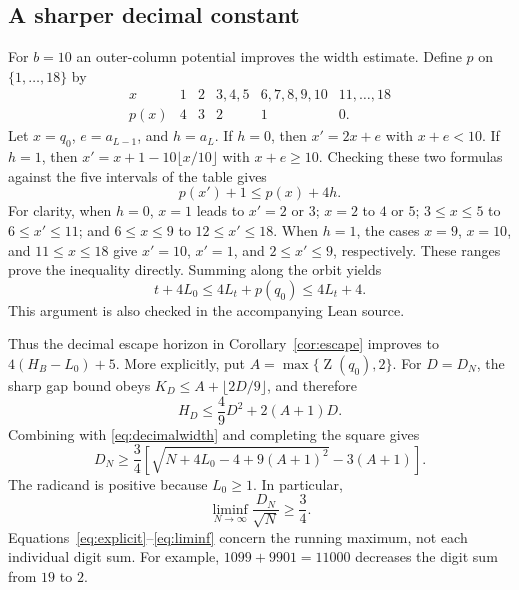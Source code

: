 \documentclass[11pt]{article}
\newcommand{\zg}{\operatorname{Z}}
\begin{document}
\subsection*{A sharper decimal constant}
For $b=10$ an outer-column potential improves the width estimate.
Define $p$ on $\{1,\ldots,18\}$ by
\[
\begin{array}{c|ccccc}
x&1&2&3,4,5&6,7,8,9,10&11,\ldots,18\\ \hline
p(x)&4&3&2&1&0.
\end{array}
\]
Let $x=q_0$, $e=a_{L-1}$, and $h=a_L$. If $h=0$, then
$x'=2x+e$ with $x+e<10$. If $h=1$, then
$x'=x+1-10\lfloor x/10\rfloor$ with $x+e\geq10$.
Checking these two formulas against the five intervals of the table gives
\[
 p(x')+1\leq p(x)+4h.
\]
For clarity, when $h=0$, $x=1$ leads to $x'=2$ or $3$;
$x=2$ to $4$ or $5$; $3\leq x\leq5$ to $6\leq x'\leq11$;
and $6\leq x\leq9$ to $12\leq x'\leq18$.
When $h=1$, the cases $x=9$, $x=10$, and $11\leq x\leq18$
give $x'=10$, $x'=1$, and $2\leq x'\leq9$, respectively.
These ranges prove the inequality directly. Summing along the orbit yields
\begin{equation}\label{eq:decimalwidth}
 t+4L_0\leq4L_t+p(q_0)\leq4L_t+4.
\end{equation}
This argument is also checked in the accompanying Lean source.

Thus the decimal escape horizon in Corollary~\ref{cor:escape} improves to
$4(H_B-L_0)+5$. More explicitly, put $A=\max\{\zg(q_0),2\}$.
For $D=D_N$, the sharp gap bound obeys
$K_D\leq A+\lfloor2D/9\rfloor$, and therefore
\[
 H_D\leq\frac49D^2+2(A+1)D.
\]
Combining with \eqref{eq:decimalwidth} and completing the square gives
\begin{equation}\label{eq:explicit}
 D_N\geq\frac34\left[
 \sqrt{N+4L_0-4+9(A+1)^2}-3(A+1)\right].
\end{equation}
The radicand is positive because $L_0\geq1$. In particular,
\begin{equation}\label{eq:liminf}
 \liminf_{N\to\infty}\frac{D_N}{\sqrt N}\geq\frac34.
\end{equation}
Equations~\eqref{eq:explicit}--\eqref{eq:liminf} concern the running
maximum, not each individual digit sum. For example,
$1099+9901=11000$ decreases the digit sum from $19$ to $2$.
\end{document}
